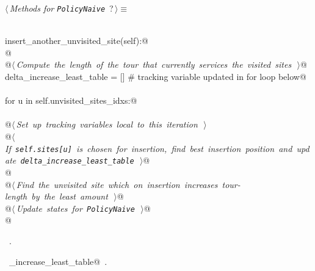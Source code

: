 \documentclass[11.5pt]{report}
\begin{document}
\newchunk 
\begin{flushleft} \small\label{scrap35}\raggedright\small
{} $\langle\,${\itshape Methods for \verb|PolicyNaive|}\nobreak\ {\footnotesize {?}}$\,\rangle\equiv$
\vspace{-1ex}
\begin{list}{}{} \item
\mbox{}\verb@@\\
\mbox{}\verb@def insert_another_unvisited_site(self):@\\
\mbox{}\verb@ @\\
\mbox{}\verb@     @\hbox{$\langle\,${\itshape Compute the length of the tour that currently services the visited sites}\nobreak\ {\footnotesize {}}$\,\rangle$}\verb@    @\\
\mbox{}\verb@     delta_increase_least_table = [] # tracking variable updated in for loop below@\\
\mbox{}\verb@@\\
\mbox{}\verb@     for u in self.unvisited_sites_idxs:@\\
\mbox{}\verb@@\\
\mbox{}\verb@         @\hbox{$\langle\,${\itshape Set up tracking variables local to this iteration}\nobreak\ {\footnotesize {}}$\,\rangle$}\verb@@\\
\mbox{}\verb@         @\hbox{$\langle\,${\itshape If \texttt{self.sites[u]} is chosen for insertion, find best insertion position and update \texttt{delta\_increase\_least\_table}}\nobreak\ {\footnotesize {}}$\,\rangle$}\verb@  @\\
\mbox{}\verb@                 @\\
\mbox{}\verb@     @\hbox{$\langle\,${\itshape Find the unvisited site which on insertion increases tour-length by the least amount}\nobreak\ {\footnotesize {}}$\,\rangle$}\verb@     @\\
\mbox{}\verb@     @\hbox{$\langle\,${\itshape Update states for \texttt{PolicyNaive}}\nobreak\ {\footnotesize {}}$\,\rangle$}\verb@ @\\
\mbox{}\verb@ @\\
\mbox{}\verb@@{\NWsep}
\end{list}
\vspace{-1.5ex}
\footnotesize
\begin{list}{}{\setlength{\itemsep}{-\parsep}\setlength{\itemindent}{-\leftmargin}}
\item \NWtxtMacroRefIn\ .
\item \NWtxtIdentsDefed\nobreak\  \verb@delta_increase_least_table@\nobreak\ .
\item{}
\end{list}
\vspace{4ex}
\end{flushleft}
\newchunk 
\end{document}
